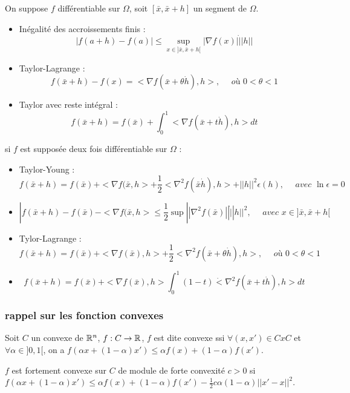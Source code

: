 	On suppose $f$ différentiable sur $\Omega$, soit $[\bar{x}, \bar{x}+h]$ un segment de $\Omega$.
	\begin{itemize}
		\item Inégalité des accroissements finis : \[|f(a+h) -f(a)| \leq \sup_{ x \in ]\bar{x}, \bar{x}+h[ } |\nabla f(x)| \dot ||h||\]
		\item Taylor-Lagrange : \[f(\bar{x}+h) - f(x) = <\nabla f(\bar{x}+\theta \dot h), h>, \quad \textit{ où } 0<\theta <1\]
		\item Taylor avec reste intégral : \[f(\bar{x}+h) = f(\bar{x}) + \int_0^1 <\nabla f(\bar{x}+ t \dot h), h> dt\]
	\end{itemize}
	si $f$ est supposée deux fois différentiable sur $\Omega$ :
	\begin{itemize}
		\item Taylor-Young : \[f(\bar{x}+h) = f(\bar{x}) + <\nabla f(\bar{x}, h> + \frac{1}{2} <\nabla^2 f(\bar{x} \dot h), h> + ||h||^2 \epsilon (h), \quad \textit{ avec } \ln \epsilon = 0\]
		\item \[|f(\bar{x}+h) - f(\bar{x}) - <\nabla f(\bar{x}, h> \leq \frac{1}{2} \sup || \nabla^2 f(\bar{x})|| \dot ||h||^2, \quad \textit{ avec } x \in ]\bar{x}, \bar{x}+h[\]
		\item Tylor-Lagrange : \[f(\bar{x}+h) = f(\bar{x}) + <\nabla f(\bar{x}), h> + \frac{1}{2} <\nabla^2 f(\bar{x}+ \theta \dot h), h>, \quad \textit{ où } 0< \theta <1\]
		\item \[f(\bar{x}+h) = f(\bar{x}) + <\nabla f(\bar{x}), h> \int_0^1 (1-t) \dot <\nabla^2 f(\bar{x}+ t \dot h), h> dt\]
	\end{itemize}
	
		\subsubsection{rappel sur les fonction convexes}
		
		\begin{definition}
		Soit $C$ un convexe de $\mathbb{R}^n$, $f:C\rightarrow \mathbb{R}$, $f$ est dite convexe ssi $\forall (x, x') \in C x C$ et $\forall \alpha \in ]0,1[$, on a $f(\alpha x + (1-\alpha) x') \leq \alpha f(x) + (1-\alpha) f(x')$.
		\end{definition}
		
		\begin{definition}
		$f$ est fortement convexe sur $C$ de module de forte convexité $c>0$ si $f(\alpha x + (1-\alpha) x') \leq \alpha f(x) + (1-\alpha) f(x') -\frac{1}{2} c \alpha (1-\alpha) ||x'-x||^2$.
		\end{definition}
		

